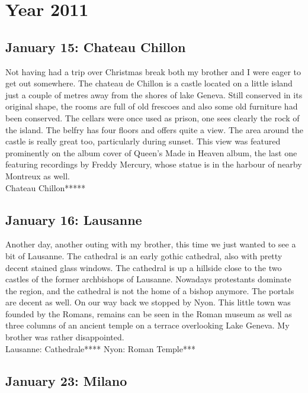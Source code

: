 \chapter{Year 2011}
\label{2011}

\section{January 15: Chateau Chillon}
\label{2011:Chillon}

Not having had a trip over Christmas break both my brother and I were eager to get out somewhere. The chateau de Chillon is a castle located on a little island just a couple of metres away from the shores of lake Geneva. Still conserved in its original shape, the rooms are full of old frescoes and also some old furniture had been conserved. The cellars were once used as prison, one sees clearly the rock of the island. The belfry has four floors and offers quite a view. The area around the castle is really great too, particularly during sunset. This view was featured prominently on the album cover of Queen's Made in Heaven album, the last one featuring recordings by Freddy Mercury, whose statue is in the harbour of nearby Montreux as well.\\

Chateau Chillon*****

\section{January 16: Lausanne}
\label{Lausanne2011}

Another day, another outing with my brother, this time we just wanted to see a bit of Lausanne. The cathedral is an early gothic cathedral, also with pretty decent stained glass windows. The cathedral is up a hillside close to the two castles of the former archbishops of Lausanne. Nowadays protestants dominate the region, and the cathedral is not the home of a bishop anymore. The portals are decent as well. On our way back we stopped by Nyon. This little town was founded by the Romans, remains can be seen in the Roman museum as well as three columns of an ancient temple on a terrace overlooking Lake Geneva. My brother was rather disappointed.\\

Lausanne: Cathedrale****
Nyon: Roman Temple***

\section{January 23: Milano}
\label{Milano2011}

